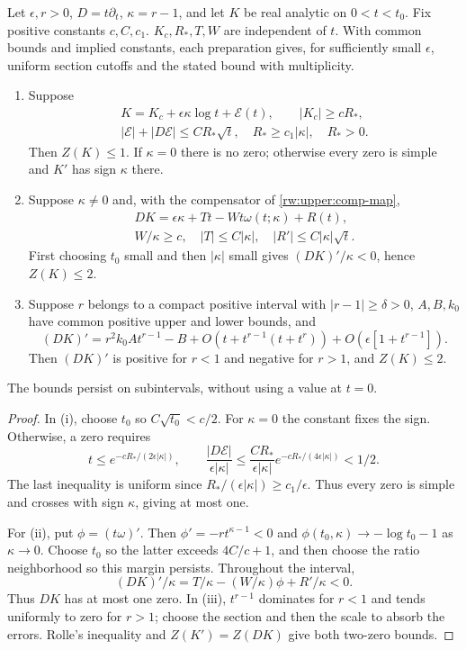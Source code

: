 \begin{lemma}
\label{rw:finite:saddle-counting}
Let $\epsilon,r>0$, $D=t\partial_t$, $\kappa=r-1$, and let $K$
be real analytic on $0<t<t_0$. Fix positive constants $c,C,c_1$.
$K_c,R_*,T,W$ are independent of $t$. With common bounds and
implied constants, each preparation gives, for sufficiently small
$\epsilon$, uniform section cutoffs and the stated bound with multiplicity.
\begin{enumerate}[label=\textup{(\roman*)}]
\item Suppose
\[
\begin{gathered}
 K=K_c+\epsilon\kappa\log t+\mathcal E(t),\qquad
 |K_c|\ge cR_*,\\
 |\mathcal E|+|D\mathcal E|\le CR_*\sqrt t,
 \quad R_*\ge c_1|\kappa|,\quad R_*>0.
\end{gathered}
\]
Then $Z(K)\le1$. If $\kappa=0$ there is no zero; otherwise
every zero is simple and $K'$ has sign $\kappa$ there.
\item Suppose $\kappa\ne0$ and, with the compensator of
\eqref{rw:upper:comp-map},
\[
\begin{gathered}
 DK=\epsilon\kappa+Tt-Wt\omega(t;\kappa)+R(t),\\
 W/\kappa\ge c,\quad |T|\le C|\kappa|,\quad
 |R'|\le C|\kappa|\sqrt t .
\end{gathered}
\]
First choosing $t_0$ small and then $|\kappa|$ small gives
$(DK)'/\kappa<0$, hence $Z(K)\le2$.
\item Suppose $r$ belongs to a compact positive interval with
$|r-1|\ge\delta>0$, $A,B,k_0$ have common positive upper and
lower bounds, and
\[
 (DK)'=r^2k_0At^{r-1}-B
       +O(t+t^{r-1}(t+t^r))+O(\epsilon[1+t^{r-1}]).
\]
Then $(DK)'$ is positive for $r<1$ and negative for $r>1$,
and $Z(K)\le2$.
\end{enumerate}
The bounds persist on subintervals, without using a value at $t=0$.
\end{lemma}
\begin{proof}
In \textup{(i)}, choose $t_0$ so $C\sqrt{t_0}<c/2$.
For $\kappa=0$ the constant fixes the sign. Otherwise, a zero requires
\[
 t\le e^{-cR_*/(2\epsilon|\kappa|)},\qquad
 \frac{|D\mathcal E|}{\epsilon|\kappa|}
 \le\frac{CR_*}{\epsilon|\kappa|}
          e^{-cR_*/(4\epsilon|\kappa|)}<1/2 .
\]
The last inequality is uniform since
$R_*/(\epsilon|\kappa|)\ge c_1/\epsilon$. Thus every zero is simple
and crosses with sign $\kappa$, giving at most one.

For \textup{(ii)}, put $\phi=(t\omega)'$. Then
$\phi'=-rt^{\kappa-1}<0$ and
$\phi(t_0,\kappa)\to-\log t_0-1$ as $\kappa\to0$.
Choose $t_0$ so the latter exceeds $4C/c+1$, and then choose
the ratio neighborhood so this margin persists. Throughout the interval,
\[
 (DK)'/\kappa=T/\kappa-(W/\kappa)\phi+R'/\kappa<0 .
\]
Thus $DK$ has at most one zero. In \textup{(iii)}, $t^{r-1}$
dominates for $r<1$ and tends uniformly to zero for $r>1$;
choose the section and then the scale to absorb the errors.
Rolle's inequality and $Z(K')=Z(DK)$ give both two-zero bounds.
\end{proof}

